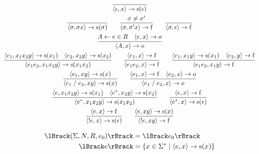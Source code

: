 \begin{gather*}
  \infer{\langle \epsilon, x\rangle \to \mathrm{s}(\epsilon)}{}
  \\
  \infer{\langle \sigma, \sigma x\rangle \to \mathrm{s}(\sigma)}{}
  \hspace{2em}
  \infer{\langle \sigma, \sigma' x\rangle \to \mathrm{f}}{
    \sigma \neq \sigma'
  }
  \hspace{2em}
  \infer{\langle \sigma, \epsilon\rangle \to \mathrm{f}}{}
  \\
  \infer{\langle A, x\rangle \to o}{
    A \assign e \in R
    &
    \langle e, x\rangle \to o
  }
  \\
  \infer{\langle e_1e_2, x_1x_2y\rangle \to \mathrm{s}(x_1x_2)}{
    \langle e_1, x_1x_2y\rangle \to \mathrm{s}(x_1)
    &
    \langle e_2, x_2y\rangle \to \mathrm{s}(x_2)
  }
  \hspace{2em}
  \infer{\langle e_1e_2, x\rangle \to \mathrm{f}}{
    \langle e_1, x\rangle \to \mathrm{f}
  }
  \hspace{2em}
  \infer{\langle e_1e_2, x_1y\rangle \to \mathrm{f}}{
    \langle e_1, x_1y\rangle \to \mathrm{s}(x_1)
    &
    \langle e_2, y\rangle \to \mathrm{f}
  }
  \\
  \infer{\langle e_1 \mathrel{/} e_2, xy\rangle \to \mathrm{s}(x)}{
    \langle e_1, xy\rangle \to \mathrm{s}(x)
  }
  \hspace{2em}
  \infer{\langle e_1 \mathrel{/} e_2, x\rangle \to o}{
    \langle e_1, x\rangle \to \mathrm{f}
    &
    \langle e_2, x\rangle \to o
  }
  \\
  \infer{\langle e^*, x_1x_2y\rangle \to \mathrm{s}(x_1x_2)}{
    \langle e, x_1x_2y\rangle \to \mathrm{s}(x_1)
    &
    \langle e^*, x_2y\rangle \to \mathrm{s}(x_2)
  }
  \hspace{2em}
  \infer{\langle e^*, x\rangle \to \mathrm{s}(\epsilon)}{
    \langle e, x\rangle \to \mathrm{f}
  }
  \\
  \infer{\langle !e, x\rangle \to \mathrm{s}(\epsilon)}{
    \langle e, x\rangle \to \mathrm{f}
  }
  \hspace{2em}
  \infer{\langle !e, xy\rangle \to \mathrm{f}}{
    \langle e, xy\rangle \to \mathrm{s}(x)
  }
\end{gather*}

\begin{align*}
  \semanticf{(\Sigma, N, R, e_0)} &= \semanticf{e_0} \\
  \semanticf{e} &= \{x \in \Sigma^* \mid \langle e, x\rangle \to \mathrm{s}(x)\}
\end{align*}

